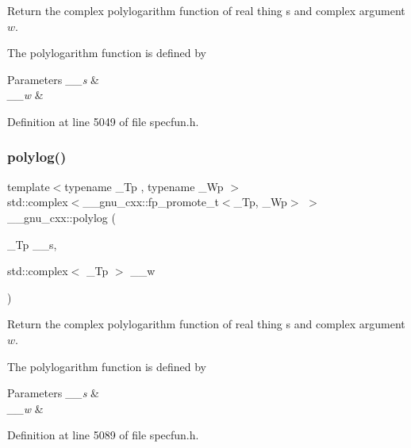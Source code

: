 Return the complex polylogarithm function of real thing {\ttfamily s} and complex argument $ w $.

The polylogarithm function is defined by \[ \]


\begin{DoxyParams}{Parameters}
{\em \+\_\+\+\_\+s} & \\
\hline
{\em \+\_\+\+\_\+w} & \\
\hline
\end{DoxyParams}


Definition at line 5049 of file specfun.\+h.

\mbox{\label{group__gnu__math__spec__func_ga817a208972a0200b667c68d199176d70}} 
\subsubsection{\texorpdfstring{polylog()}{polylog()}\hspace{0.1cm}{\footnotesize\ttfamily [2/2]}}
{\footnotesize\ttfamily template$<$typename \+\_\+\+Tp , typename \+\_\+\+Wp $>$ \\
std\+::complex$<$\+\_\+\+\_\+gnu\+\_\+cxx\+::fp\+\_\+promote\+\_\+t$<$\+\_\+\+Tp, \+\_\+\+Wp$>$ $>$ \+\_\+\+\_\+gnu\+\_\+cxx\+::polylog (\begin{DoxyParamCaption}\item[{\+\_\+\+Tp}]{\+\_\+\+\_\+s,  }\item[{std\+::complex$<$ \+\_\+\+Tp $>$}]{\+\_\+\+\_\+w }\end{DoxyParamCaption})\hspace{0.3cm}{\ttfamily [inline]}}

Return the complex polylogarithm function of real thing {\ttfamily s} and complex argument $ w $.

The polylogarithm function is defined by \[ \]


\begin{DoxyParams}{Parameters}
{\em \+\_\+\+\_\+s} & \\
\hline
{\em \+\_\+\+\_\+w} & \\
\hline
\end{DoxyParams}


Definition at line 5089 of file specfun.\+h.

